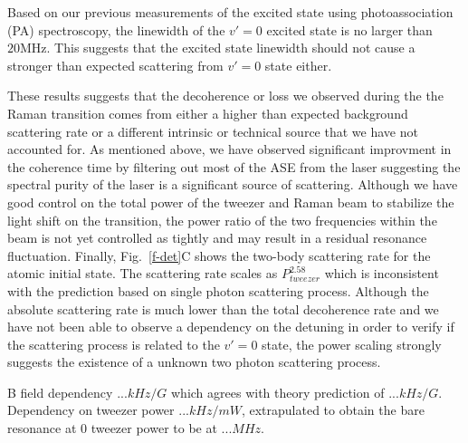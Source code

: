 \documentclass[aps,prl,twocolumn,groupedaddress]{revtex4-1}
\newcommand{\todo}[1]{}
\begin{document}
Based on our previous measurements of the excited state using photoassociation (PA) spectroscopy,
the linewidth of the $v'=0$ excited state is no larger than $20 \mathrm{MHz}$.
This suggests that the excited state linewidth should not cause a stronger than expected
scattering from $v'=0$ state either.

These results suggests that the decoherence or loss we observed during the the Raman transition
comes from either a higher than expected background scattering rate
or a different intrinsic or technical source that we have not accounted for.
As mentioned above, we have observed significant improvment in the coherence time
by filtering out most of the ASE from the laser suggesting the spectral purity of
the laser is a significant source of scattering.
Although we have good control on the total power of the tweezer and Raman beam to stabilize
the light shift on the transition, the power ratio of the two frequencies within the beam
is not yet controlled as tightly and may result in a residual resonance fluctuation.
Finally, Fig.~\ref{f-det}C shows the two-body scattering rate for the atomic initial state.
The scattering rate scales as $P_{tweezer}^{2.58}$ which is inconsistent with
the prediction based on single photon scattering process.
Although the absolute scattering rate is much lower than the total decoherence rate
and we have not been able to observe a dependency on the detuning in order to
verify if the scattering process is related to the $v'=0$ state, the power scaling
strongly suggests the existence of a unknown two photon scattering process.

B field dependency $... kHz/G$ which agrees with theory prediction of $... kHz/G$.
Dependency on tweezer power $... kHz/mW$, extrapulated to obtain the bare resonance at $0$ tweezer power to be at $... MHz$.

\todo{sm: STIRAP vs Raman}



\end{document}
